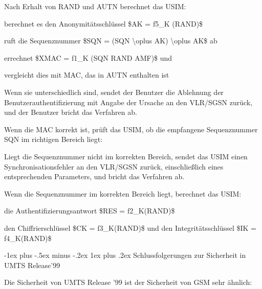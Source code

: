 \documentclass[a4paper]{article}
\makeatletter
\renewcommand{\subsubsection}{\@startsection{subsubsection}{3}{0mm}%
 {-1ex plus -.5ex minus -.2ex}%
 {1ex plus .2ex}%
 {\normalfont\small\bfseries}}
\makeatother
\begin{document}
\begin{multicols}{3}
\begin{itemize*}
            \begin{itemize*}
                  \item Nach Erhalt von RAND und AUTN berechnet das USIM:
                  \item berechnet es den Anonymitätsschlüssel \$AK = f5\_K (RAND)\$
                  \item ruft die Sequenznummer \$SQN = (SQN \textbackslash oplus AK) \textbackslash oplus AK\$ ab
                  \item errechnet \$XMAC = f1\_K (SQN \textbar\textbar{} RAND \textbar\textbar{} AMF)\$ und
                  \item vergleicht dies mit MAC, das in AUTN enthalten ist
                  \item Wenn sie unterschiedlich sind, sendet der Benutzer die Ablehnung der Benutzerauthentifizierung mit Angabe der Ursache an den VLR/SGSN zurück, und der Benutzer bricht das Verfahren ab.
                  \item Wenn die MAC korrekt ist, prüft das USIM, ob die empfangene Sequenznummer SQN im richtigen Bereich liegt:
                  \begin{itemize*} \item Liegt die Sequenznummer nicht im korrekten Bereich, sendet das USIM einen Synchronisationsfehler an den VLR/SGSN zurück, einschließlich eines entsprechenden Parameters, und bricht das Verfahren ab. \end{itemize*}
                  \item Wenn die Sequenznummer im korrekten Bereich liegt, berechnet das USIM:
                  \begin{itemize*} \item die Authentifizierungsantwort \$RES = f2\_K(RAND)\$ \item den Chiffrierschlüssel \$CK = f3\_K(RAND)\$ und den Integritätsschlüssel \$IK = f4\_K(RAND)\$ \end{itemize*}
            \end{itemize*}
      \end{itemize*}


      \subsubsection{Schlussfolgerungen zur Sicherheit in UMTS
            Release'99}

      \begin{itemize*}
            \item
            Die Sicherheit von UMTS Release '99 ist der Sicherheit von GSM sehr
            ähnlich:


\end{itemize*}
\end{multicols}
\end{document}
